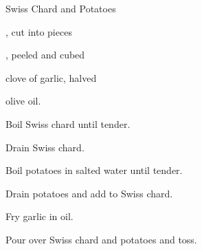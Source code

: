 \begin{recipe}{Swiss Chard and Potatoes}{}{}

\begin{ingredients}
\item {}, cut into pieces
\item {}, peeled and cubed
\item clove of garlic, halved
\item olive oil.
\end{ingredients}

\begin{directions}
\item Boil Swiss chard until tender.
\item Drain Swiss chard.
\item Boil potatoes in salted water until tender.
\item Drain potatoes and add to Swiss chard.
\item Fry garlic in oil.
\item Pour over Swiss chard and potatoes and toss.
\end{directions}

\end{recipe}
